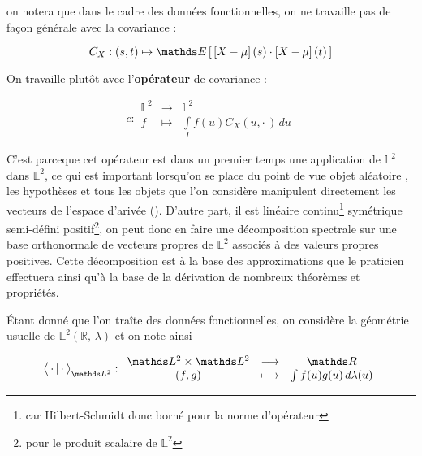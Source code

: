 \begin{rem}
    on notera que dans le cadre des données fonctionnelles, on ne travaille pas de façon générale avec la covariance :

    $$C_X : (s,t) \mapsto \esperance{ \left[X - \mu\right](s) \cdot \left[X - \mu\right](t) }$$

    On travaille plutôt avec l'\textbf{opérateur} de covariance :

    \begin{equation*}
        c : \begin{array}{ccc}
            \mathds L^2 & \longrightarrow & \mathds L^2                             \\
            f           & \longmapsto     & \int\limits_I f(u)C_X(u, \cdot \,) \,du
        \end{array}
    \end{equation*}

    C'est parceque cet opérateur est dans un premier temps une application de $\mathds L^2$ dans $\mathds L^2$, ce qui est important lorsqu'on se place du point de vue \og objet aléatoire \fg, les hypothèses et tous les objets que l'on considère manipulent directement les vecteurs de l'espace d'arivée (\edited). D'autre part, il est linéaire continu\footnote{car Hilbert-Schmidt donc borné pour la norme d'opérateur} symétrique semi-défini positif\footnote{pour le produit scalaire de $\mathds L^2$}, on peut donc en faire une décomposition spectrale sur une base orthonormale de vecteurs propres de $\mathds L^2$ associés à des valeurs propres positives. Cette décomposition est à la base des approximations que le praticien effectuera ainsi qu'à la base de la dérivation de nombreux théorèmes et propriétés.
\end{rem}

\bigskip

\noindent Étant donné que l'on traîte des données fonctionnelles, on considère la géométrie usuelle de $\mathds L^2(\mathds R, \, \lambda)$ et on note ainsi

\begin{equation*}
    \prodscalselon \cdot \cdot {\mathds L^2}: \begin{array}{ccc}
        \mathds L^2 \times \mathds L^2 & \longrightarrow & \mathds R
        \\
        (f,g)                          & \longmapsto     & \int f(u)g(u) \, d\lambda(u)
    \end{array}
\end{equation*}

